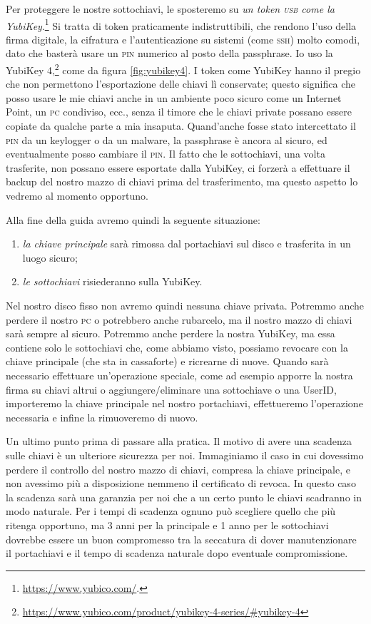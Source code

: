 Per proteggere le nostre sottochiavi, le sposteremo su \emph{un token
\textsc{usb} come la YubiKey}.\footnote{\url{https://www.yubico.com/}.} Si
tratta di token praticamente indistruttibili, che rendono l'uso della firma
digitale, la cifratura e l'autenticazione su sistemi (come \textsc{ssh}) molto
comodi, dato che basterà usare un \textsc{pin} numerico al posto della
passphrase. Io uso la YubiKey
4,\footnote{\url{https://www.yubico.com/product/yubikey-4-series/\#yubikey-4}}
come da figura \vref{fig:yubikey4}. I token come YubiKey hanno il pregio che non
permettono l'esportazione delle chiavi lì conservate; questo significa che posso
usare le mie chiavi anche in un ambiente poco sicuro come un Internet Point, un
\textsc{pc} condiviso, ecc., senza il timore che le chiavi private possano
essere copiate da qualche parte a mia insaputa. Quand'anche fosse stato
intercettato il \textsc{pin} da un keylogger o da un malware, la passphrase è
ancora al sicuro, ed eventualmente posso cambiare il \textsc{pin}. Il fatto che
le sottochiavi, una volta trasferite, non possano essere esportate dalla
YubiKey, ci forzerà a effettuare il backup del nostro mazzo di chiavi prima del
trasferimento, ma questo aspetto lo vedremo al momento opportuno.\bigskip

Alla fine della guida avremo quindi la seguente situazione:

\begin{enumerate}
  \item \emph{la chiave principale} sarà rimossa dal portachiavi sul disco e
  trasferita in un luogo sicuro;
  \item \emph{le sottochiavi} risiederanno sulla YubiKey.
\end{enumerate}

Nel nostro disco fisso non avremo quindi nessuna chiave privata. Potremmo anche
perdere il nostro \textsc{pc} o potrebbero anche rubarcelo, ma il nostro mazzo
di chiavi sarà sempre al sicuro. Potremmo anche perdere la nostra YubiKey, ma
essa contiene solo le sottochiavi che, come abbiamo visto, possiamo revocare con
la chiave principale (che sta in cassaforte) e ricrearne di nuove. Quando sarà
necessario effettuare un'operazione speciale, come ad esempio apporre la nostra
firma su chiavi altrui o aggiungere/eliminare una sottochiave o una UserID,
importeremo la chiave principale nel nostro portachiavi, effettueremo
l'operazione necessaria e infine la rimuoveremo di nuovo.\bigskip

Un ultimo punto prima di passare alla pratica. Il motivo di avere una
scadenza sulle chiavi è un ulteriore sicurezza per noi. Immaginiamo il caso in
cui dovessimo perdere il controllo del nostro mazzo di chiavi, compresa la
chiave principale, e non avessimo più a disposizione nemmeno il certificato di
revoca. In questo caso la scadenza sarà una garanzia per noi che a un certo
punto le chiavi scadranno in modo naturale. Per i tempi di scadenza ognuno può
scegliere quello che più ritenga opportuno, ma 3 anni per la principale e 1 anno
per le sottochiavi dovrebbe essere un buon compromesso tra la seccatura di dover
manutenzionare il portachiavi e il tempo di scadenza naturale dopo eventuale
compromissione.\bigskip

